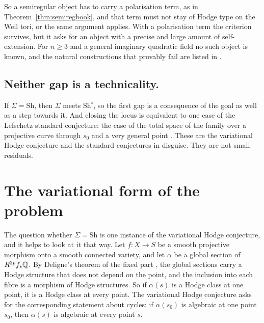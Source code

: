 So a semiregular object has to carry a polarisation term, as in
Theorem~\ref{thm:semiregbook}, and that term must not stay of Hodge type on
the Weil tori, or the same argument applies. With a polarisation term the
criterion survives, but it asks for an object with a precise and large
amount of self-extension. For $n\ge3$ and a general imaginary quadratic
field no such object is known, and the natural constructions that provably
fail are listed in \cite{BhH8}.

\subsection*{Neither gap is a technicality.}
If $\Sigma=\mathrm{Sh}$, then $\Sigma$ meets $\mathrm{Sh}^{\circ}$, so the first gap is
a consequence of the goal as well as a step towards it. And closing the
locus is equivalent to one case of the Lefschetz standard conjecture: the
case of the total space of the family over a projective curve through
$s_{0}$ and a very general point \cite{BhH8}. These are the variational Hodge
conjecture and the standard conjectures in disguise. They are not small residuals.

\section{The variational form of the problem}\label{sec:vhcbook}

The question whether $\Sigma=\mathrm{Sh}$ is one instance of the variational Hodge
conjecture, and it helps to look at it that way. Let $f\colon X\to S$ be a
smooth projective morphism onto a smooth connected variety, and let
$\alpha$ be a global section of $R^{2p}f_{*}\mathbb{Q}$. By Deligne's theorem of the
fixed part \cite{Del71}, the global sections carry a Hodge structure that
does not depend on the point, and the inclusion into each fibre is a
morphism of Hodge structures. So if $\alpha(s)$ is a Hodge class at one
point, it is a Hodge class at every point. The variational Hodge conjecture
asks for the corresponding statement about cycles: if $\alpha(s_{0})$ is
algebraic at one point $s_{0}$, then $\alpha(s)$ is algebraic at every
point $s$.

